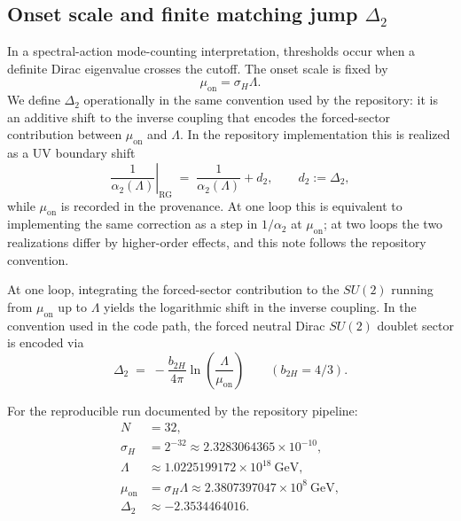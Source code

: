 \documentclass[11pt]{article}
\begin{document}
\subsection{Onset scale and finite matching jump \texorpdfstring{$\Delta_2$}{Delta2}}
\label{sec:delta2}
In a spectral-action mode-counting interpretation, thresholds occur when a definite Dirac eigenvalue crosses the cutoff. The onset scale is fixed by
\begin{equation}
\boxed{\mu_{\mathrm{on}} = \sigma_H \Lambda}.
\end{equation}
We define $\Delta_2$ operationally in the same convention used by the repository: it is an additive
shift to the inverse coupling that encodes the forced-sector contribution between $\mu_{\mathrm{on}}$
and $\Lambda$. In the repository implementation this is realized as a UV boundary shift
\[
\left.\frac{1}{\alpha_2(\Lambda)}\right|_{\text{RG}} \;=\; \frac{1}{\alpha_2(\Lambda)} + d_2,
\qquad d_2 := \Delta_2,
\]
while $\mu_{\mathrm{on}}$ is recorded in the provenance. At one loop this is equivalent to implementing
the same correction as a step in $1/\alpha_2$ at $\mu_{\mathrm{on}}$; at two loops the two realizations
differ by higher-order effects, and this note follows the repository convention.

At one loop, integrating the forced-sector contribution to the $SU(2)$ running from $\mu_{\mathrm{on}}$
up to $\Lambda$ yields the logarithmic shift in the inverse coupling. In the convention used in the
code path, the forced neutral Dirac $SU(2)$ doublet sector is encoded via
\begin{equation}
\boxed{
\Delta_2 \;=\; -\frac{b_{2H}}{4\pi}\ln\!\left(\frac{\Lambda}{\mu_{\mathrm{on}}}\right)
}
\qquad (b_{2H}=4/3).
\label{eq:delta2_def}
\end{equation}

For the reproducible run documented by the repository pipeline:
\begin{align}
N &= 32,\\
\sigma_H &= 2^{-32} \approx 2.3283064365\times 10^{-10},\\
\Lambda &\approx 1.0225199172\times 10^{18}\ \mathrm{GeV},\\
\mu_{\mathrm{on}} &= \sigma_H \Lambda \approx 2.3807397047\times 10^{8}\ \mathrm{GeV},\\
\Delta_2 &\approx -2.3534464016.
\end{align}
\end{document}
